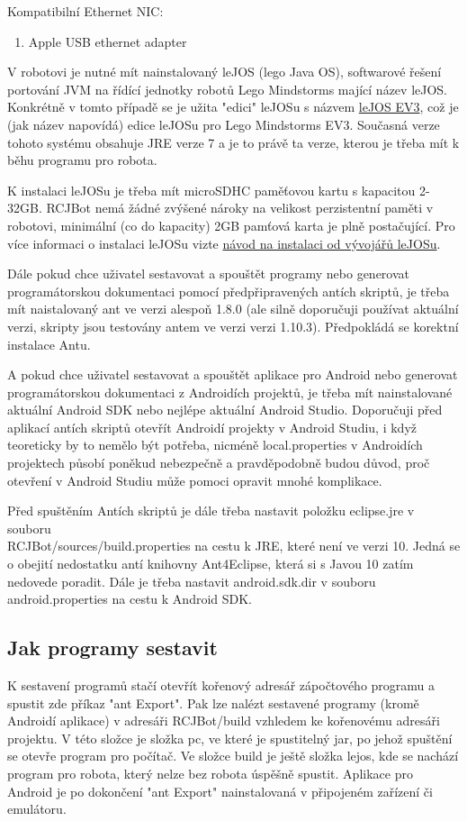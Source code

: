\documentclass[12pt, ngerman]{article}
\begin{document}
Kompatibilní Ethernet NIC:
\begin{enumerate}[leftmargin=5mm]
\item Apple USB ethernet adapter
\end{enumerate}

V robotovi je nutné mít nainstalovaný leJOS (lego Java OS), softwarové řešení portování JVM na řídící jednotky robotů Lego Mindstorms mající název leJOS. Konkrétně v tomto případě se je užita "edici" leJOSu s názvem \href{http://www.lejos.org/ev3.php}{leJOS EV3}, což je (jak název napovídá) edice leJOSu pro Lego Mindstorms EV3. Současná verze tohoto systému obsahuje JRE verze 7 a je to právě ta verze, kterou je třeba mít k běhu programu pro robota.

K instalaci leJOSu je třeba mít microSDHC paměťovou kartu s kapacitou 2-32GB. RCJBot nemá žádné zvýšené nároky na velikost perzistentní paměti v robotovi, minimální (co do kapacity) 2GB pamťová karta je plně postačující. Pro více informaci o instalaci leJOSu vizte \href{https://sourceforge.net/p/lejos/wiki/Windows Installation/}{návod na instalaci od vývojářů leJOSu}.

Dále pokud chce uživatel sestavovat a spouštět programy nebo generovat programátorskou dokumentaci pomocí předpřipravených antích skriptů, je třeba mít naistalovaný ant ve verzi alespoň 1.8.0 (ale silně doporučuji používat aktuální verzi, skripty jsou testovány antem ve verzi verzi 1.10.3). Předpokládá se korektní instalace Antu.

A pokud chce uživatel sestavovat a spouštět aplikace pro Android nebo generovat programátorskou dokumentaci z Androidích projektů, je třeba mít nainstalované aktuální Android SDK nebo nejlépe aktuální Android Studio. Doporučuji před aplikací antích skriptů otevřít Androidí projekty v Android Studiu, i když teoreticky by to nemělo být potřeba, nicméně local.properties v Androidích projektech působí poněkud nebezpečně a pravděpodobně budou důvod, proč otevření v Android Studiu může pomoci opravit mnohé komplikace.

Před spuštěním Antích skriptů je dále třeba nastavit položku eclipse.jre v souboru\\
RCJBot/sources/build.properties na cestu k JRE, které není ve verzi 10. Jedná se o obejití nedostatku antí knihovny Ant4Eclipse, která si s Javou 10 zatím nedovede poradit. Dále je třeba nastavit android.sdk.dir v souboru android.properties na cestu k Android SDK.

\subsection{Jak programy sestavit}
K sestavení programů stačí otevřít kořenový adresář zápočtového programu a spustit zde příkaz "ant Export". Pak lze nalézt sestavené programy (kromě Androidí aplikace) v adresáři RCJBot/build vzhledem ke kořenovému adresáři projektu. V této složce je složka pc, ve které je spustitelný jar, po jehož spuštění se otevře program pro počítač. Ve složce build je ještě složka lejos, kde se nachází program pro robota, který nelze bez robota úspěšně spustit. Aplikace pro Android je po dokončení "ant Export" nainstalovaná v připojeném zařízení či emulátoru.
\end{document}
